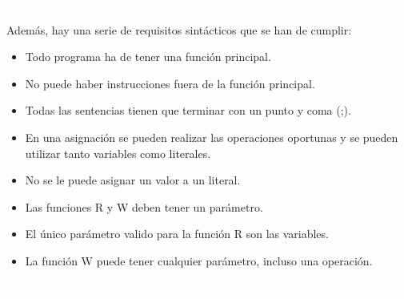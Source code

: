 \textcolor{white}{.}

Además, hay una serie de requisitos sintácticos que se han de cumplir:

\begin{itemize}
	\item Todo programa ha de tener una función principal.
	\item No puede haber instrucciones fuera de la función principal.
	\item Todas las sentencias tienen que terminar con un punto y coma (;).
	\item En una asignación se pueden realizar las operaciones oportunas y se pueden utilizar tanto variables como literales.
	\item No se le puede asignar un valor a un literal.
	\item Las funciones R y W deben tener un parámetro.
	\item El único parámetro valido para la función R son las variables.
	\item La función W puede tener cualquier parámetro, incluso una operación.
\end{itemize}

\textcolor{white}{.}

